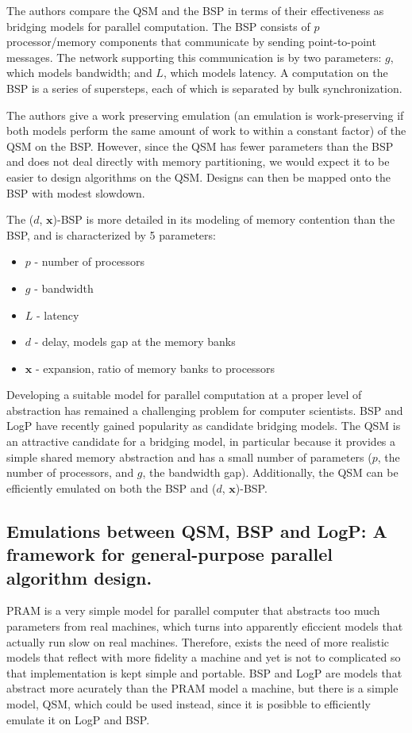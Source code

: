\documentclass[12pt,a4paper]{article}
\begin{document}
The authors compare the QSM and the BSP in terms of their effectiveness as bridging models for parallel computation. The BSP consists of $p$ processor/memory
components that communicate by sending point-to-point messages. The network supporting this communication is by two parameters: $g$, which models bandwidth;
and $L$, which models latency. A computation on the BSP is a series of supersteps, each of which is separated by bulk synchronization.

The authors give a work preserving emulation (an emulation is work-preserving if both models perform the same amount of work to within a constant factor) of
the QSM on the BSP. However, since the QSM has fewer parameters than the BSP and does not deal directly with memory partitioning, we would expect it to be
easier to design algorithms on the QSM. Designs can then be mapped onto the BSP with modest slowdown. 

The ($d$, $\textbf{x}$)-BSP is more detailed in its modeling of memory contention than the BSP, and is characterized by 5 parameters:

\begin{itemize}
\item $p$ - number of processors
\item $g$ - bandwidth
\item $L$ - latency
\item $d$ - delay, models gap at the memory banks
\item $\textbf{x}$ - expansion, ratio of memory banks to processors
\end{itemize}

Developing a suitable model for parallel computation at a proper level of abstraction has remained a challenging problem for computer scientists. BSP and LogP
have recently gained popularity as candidate bridging models. The QSM is an attractive candidate for a bridging model, in particular because it provides a
simple shared memory abstraction and has a small number of parameters ($p$, the number of processors, and $g$, the bandwidth gap). Additionally, the QSM can be
efficiently emulated on both the BSP and ($d$, $\textbf{x}$)-BSP.


\subsection{Emulations between QSM, BSP and LogP: A framework for general-purpose parallel algorithm design. \cite{Vlr03}}

PRAM is a very simple model for parallel computer that abstracts too much parameters from real machines, which turns into apparently eficcient models that actually run slow on real machines. Therefore, exists the need of more realistic models that reflect with more fidelity a machine and yet is not to complicated so that implementation is kept simple and portable. BSP and LogP are models that abstract more acurately than the PRAM model a machine, but there is a simple model, QSM, which could be used instead, since it is posibble to efficiently emulate it on LogP and BSP.
\end{document}
